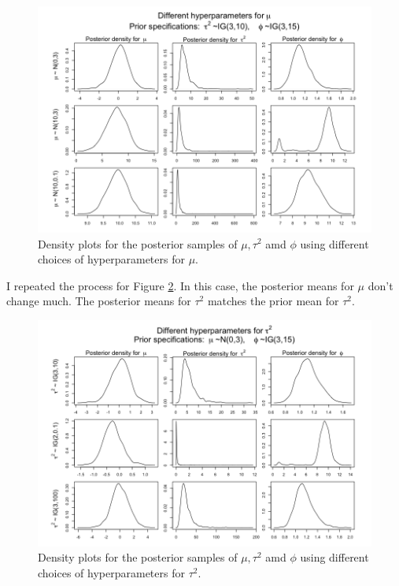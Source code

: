 \documentclass[a4paper, 10pt]{article}
\newcommand{\tausq}{\tau^2}
\begin{document}
\begin{enumerate}
\begin{enumerate}
        \begin{figure}[h!]
            \centering
            \includegraphics[scale =0.4]{Change_mus.png}
            \caption{Density plots for the posterior samples of $\mu, \tausq$ amd $\phi$ using different choices of hyperparameters for $\mu$.}
            \label{change_mus}
        \end{figure}
        I repeated the process for Figure  \ref{change_taus}. In this case, the posterior means for $\mu$ don't change much. The posterior means for $\tausq$ matches the prior mean for $\tausq$. 
        \begin{figure}[h!]
            \centering
            \includegraphics[scale =0.4]{Change_taus.png}
            \caption{Density plots for the posterior samples of $\mu, \tausq$ amd $\phi$ using different choices of hyperparameters for $\tausq$.}
            \label{change_taus}
        \end{figure}
    

\end{enumerate}
\end{enumerate}
\end{document}

